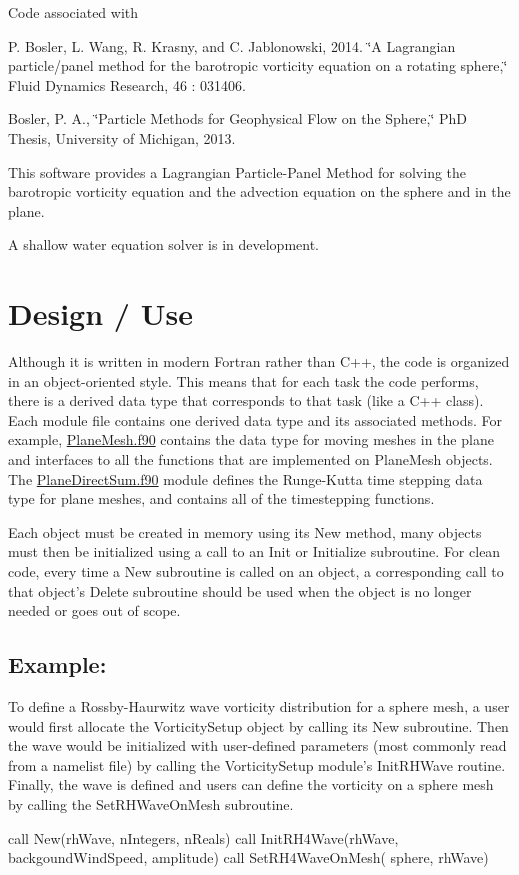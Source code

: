 Code associated with

P. Bosler, L. Wang, R. Krasny, and C. Jablonowski, 2014. \char`\"{}\+A Lagrangian particle/panel method for the barotropic vorticity equation on a rotating sphere,\char`\"{} Fluid Dynamics Research, 46 \+: 031406.

Bosler, P. A., \char`\"{}\+Particle Methods for Geophysical Flow on the Sphere,\char`\"{} Ph\+D Thesis, University of Michigan, 2013.

This software provides a Lagrangian Particle-\/\+Panel Method for solving the barotropic vorticity equation and the advection equation on the sphere and in the plane.

A shallow water equation solver is in development.

\section*{Design / Use }

Although it is written in modern Fortran rather than C++, the code is organized in an object-\/oriented style. This means that for each task the code performs, there is a derived data type that corresponds to that task (like a C++ class). Each module file contains one derived data type and its associated methods. For example, \hyperlink{_plane_mesh_8f90}{Plane\+Mesh.\+f90} contains the data type for moving meshes in the plane and interfaces to all the functions that are implemented on Plane\+Mesh objects. The \hyperlink{_plane_direct_sum_8f90}{Plane\+Direct\+Sum.\+f90} module defines the Runge-\/\+Kutta time stepping data type for plane meshes, and contains all of the timestepping functions.

Each object must be created in memory using its New method, many objects must then be initialized using a call to an Init or Initialize subroutine. For clean code, every time a New subroutine is called on an object, a corresponding call to that object's Delete subroutine should be used when the object is no longer needed or goes out of scope.

\subsection*{Example\+: }

To define a Rossby-\/\+Haurwitz wave vorticity distribution for a sphere mesh, a user would first allocate the Vorticity\+Setup object by calling its New subroutine. Then the wave would be initialized with user-\/defined parameters (most commonly read from a namelist file) by calling the Vorticity\+Setup module's Init\+R\+H\+Wave routine. Finally, the wave is defined and users can define the vorticity on a sphere mesh by calling the Set\+R\+H\+Wave\+On\+Mesh subroutine. \begin{DoxyVerb}call New(rhWave, nIntegers, nReals)
call InitRH4Wave(rhWave, backgoundWindSpeed, amplitude)
call SetRH4WaveOnMesh( sphere, rhWave)
\end{DoxyVerb}


